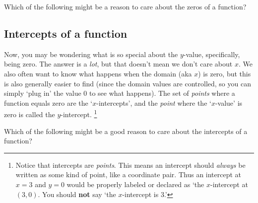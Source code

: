 \documentclass{ximeraXloud}
\begin{document}
    \begin{problem}
        Which of the following might be a reason to care about the zeros of a function?
        \begin{multipleChoice}
        \end{multipleChoice}
    \end{problem}

\subsection*{Intercepts of a function}
    Now, you may be wondering what is so special about the $y$-value, specifically, being zero. The answer is a \textit{lot}, but that doesn't mean we don't care about $x$. We also often want to know what happens when the domain (aka $x$) is zero, but this is also generally easier to find (since the domain values are controlled, so you can simply `plug in' the value 0 to see what happens). The set of \textit{points} where a function equals zero are the `$x$-intercepts', and the \textit{point} where the `$x$-value' is zero is called the $y$-intercept.%
    \footnote{%
        Notice that intercepts are \textit{points}. This means an intercept should \textit{always} be written as some kind of point, like a coordinate pair. Thus an intercept at $x=3$ and $y=0$ would be properly labeled or declared as `the $x$-intercept at $(3,0)$. You should \textbf{not} say `the $x$-intercept is 3.'%
        }
        
    \begin{problem}
        Which of the following might be a good reason to care about the intercepts of a function?
        \begin{multipleChoice}
        \end{multipleChoice}
    \end{problem}
\end{document}
